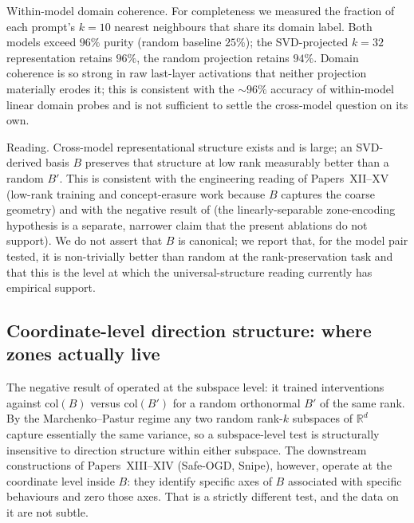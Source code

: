 \documentclass[11pt]{article}
\begin{document}
Within-model domain coherence.
For completeness we measured the fraction of each prompt's $k{=}10$
nearest neighbours that share its domain label. Both models exceed
$96\%$ purity (random baseline $25\%$); the SVD-projected $k{=}32$
representation retains $96\%$, the random projection retains $94\%$.
Domain coherence is so strong in raw last-layer activations that
neither projection materially erodes it; this is consistent with the
$\sim 96\%$ accuracy of within-model linear domain probes and is
not sufficient to settle the cross-model question on its own.

Reading. Cross-model representational structure exists and
is large; an SVD-derived basis $B$ preserves that structure at low
rank measurably better than a random $B'$. This is consistent with
the engineering reading of Papers~XII--XV (low-rank training and
concept-erasure work because $B$ captures the coarse geometry) and
with the negative result of  (the
linearly-separable zone-encoding hypothesis is a separate, narrower
claim that the present ablations do not support). We do not assert
that $B$ is canonical; we report that, for the model pair tested, it
is non-trivially better than random at the rank-preservation task and
that this is the level at which the universal-structure
reading currently has empirical support.

\subsection{Coordinate-level direction structure: where zones actually live}
\label{sec:ugt-coordinate-structure}

The negative result of  operated at the
subspace level: it trained interventions against $\mathrm{col}(B)$
versus $\mathrm{col}(B')$ for a random orthonormal $B'$ of the same
rank.  By the Marchenko--Pastur regime any two random rank-$k$
subspaces of $\mathbb{R}^d$ capture essentially the same variance, so
a subspace-level test is structurally insensitive to direction
structure within either subspace.  The downstream constructions of
Papers~XIII--XIV (Safe-OGD, Snipe), however, operate at the
coordinate level inside $B$: they identify specific axes of
$B$ associated with specific behaviours and zero those axes.  That is
a strictly different test, and the data on it are not subtle.
\end{document}
